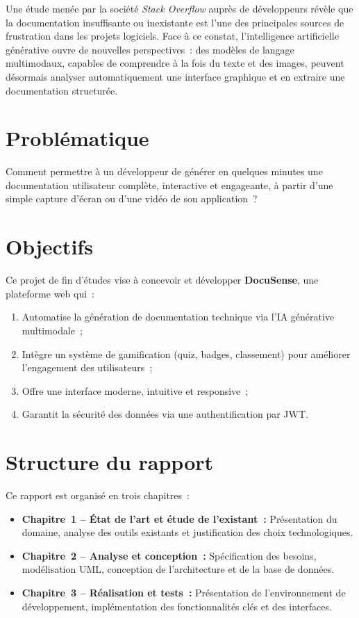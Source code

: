 \documentclass[12pt, a4paper, twoside, openany]{report}
\begin{document}
Une \'etude men\'ee par la soci\'et\'e \textit{Stack Overflow} aupr\`es de
d\'eveloppeurs r\'ev\`ele que la documentation insuffisante ou inexistante est l'une
des principales sources de frustration dans les projets logiciels. Face \`a ce constat,
l'intelligence artificielle g\'en\'erative ouvre de nouvelles perspectives~: des
mod\`eles de langage multimodaux, capables de comprendre \`a la fois du texte et des
images, peuvent d\'esormais analyser automatiquement une interface graphique et en
extraire une documentation structur\'ee.

\section*{Probl\'ematique}

Comment permettre \`a un d\'eveloppeur de g\'en\'erer en quelques minutes une
documentation utilisateur compl\`ete, interactive et engageante, \`a partir d'une
simple capture d'\'ecran ou d'une vid\'eo de son application~?

\section*{Objectifs}

Ce projet de fin d'\'etudes vise \`a concevoir et d\'evelopper \textbf{DocuSense},
une plateforme web qui~:
\begin{enumerate}[label=\textbf{\arabic*.}]
  \item Automatise la g\'en\'eration de documentation technique via l'IA g\'en\'erative
        multimodale~;
  \item Int\`egre un syst\`eme de gamification (quiz, badges, classement) pour am\'eliorer
        l'engagement des utilisateurs~;
  \item Offre une interface moderne, intuitive et responsive~;
  \item Garantit la s\'ecurit\'e des donn\'ees via une authentification par JWT.
\end{enumerate}

\section*{Structure du rapport}

Ce rapport est organis\'e en trois chapitres~:

\begin{itemize}
  \item \textbf{Chapitre~1 -- \'Etat de l'art et \'etude de l'existant~:} Pr\'esentation
        du domaine, analyse des outils existants et justification des choix technologiques.
  \item \textbf{Chapitre~2 -- Analyse et conception~:} Sp\'ecification des besoins,
        mod\'elisation UML, conception de l'architecture et de la base de donn\'ees.
  \item \textbf{Chapitre~3 -- R\'ealisation et tests~:} Pr\'esentation de l'environnement
        de d\'eveloppement, impl\'ementation des fonctionnalit\'es cl\'es et des interfaces.
\end{itemize}
\end{document}
